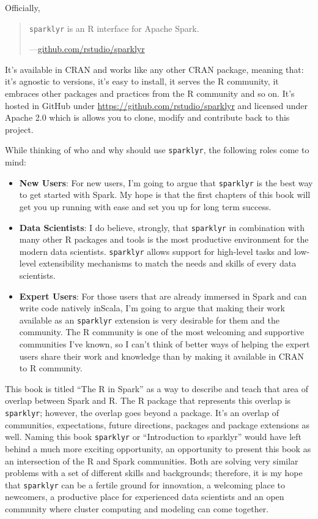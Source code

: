 \documentclass[]{book}
\providecommand{\tightlist}{%
  \setlength{\itemsep}{0pt}\setlength{\parskip}{0pt}}
\theoremstyle{definition}
\theoremstyle{definition}
\theoremstyle{definition}
\theoremstyle{remark}
\begin{document}
Officially,

\begin{quote}
\texttt{sparklyr} is an R interface for Apache Spark.

---\href{https://github.com/rstudio/sparklyr}{github.com/rstudio/sparklyr}
\end{quote}

It's available in CRAN and works like any other CRAN package, meaning
that: it's agnostic to versions, it's easy to install, it serves the R
community, it embraces other packages and practices from the R community
and so on. It's hosted in GitHub under
\href{github.com/rstudio/sparklyr}{https://github.com/rstudio/sparklyr}
and licensed under Apache 2.0 which is allows you to clone, modify and
contribute back to this project.

While thinking of who and why should use \texttt{sparklyr}, the
following roles come to mind:

\begin{itemize}
\tightlist
\item
  \textbf{New Users}: For new users, I'm going to argue that
  \texttt{sparklyr} is the best way to get started with Spark. My hope
  is that the first chapters of this book will get you up running with
  ease and set you up for long term success.
\item
  \textbf{Data Scientists}: I do believe, strongly, that
  \texttt{sparklyr} in combination with many other R packages and tools
  is the most productive environment for the modern data scientists.
  \texttt{sparklyr} allows support for high-level tasks and low-level
  extensibility mechanisms to match the needs and skills of every data
  scientists.
\item
  \textbf{Expert Users}: For those users that are already immersed in
  Spark and can write code natively inScala, I'm going to argue that
  making their work available as an \texttt{sparklyr} extension is very
  desirable for them and the community. The R community is one of the
  most welcoming and supportive communities I've known, so I can't think
  of better ways of helping the expert users share their work and
  knowledge than by making it available in CRAN to R community.
\end{itemize}

This book is titled ``The R in Spark'' as a way to describe and teach
that area of overlap between Spark and R. The R package that represents
this overlap is \texttt{sparklyr}; however, the overlap goes beyond a
package. It's an overlap of communities, expectations, future
directions, packages and package extensions as well. Naming this book
\texttt{sparklyr} or ``Introduction to sparklyr'' would have left behind
a much more exciting opportunity, an opportunity to present this book as
an intersection of the R and Spark communities. Both are solving very
similar problems with a set of different skills and backgrounds;
therefore, it is my hope that \texttt{sparklyr} can be a fertile ground
for innovation, a welcoming place to newcomers, a productive place for
experienced data scientists and an open community where cluster
computing and modeling can come together.
\end{document}
